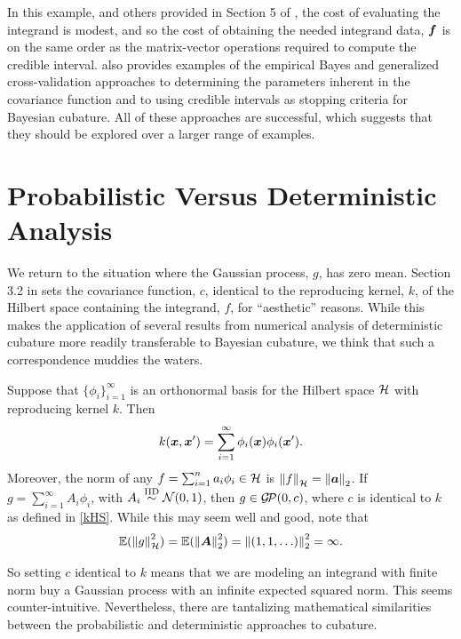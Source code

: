 \documentclass[sts]{imsart}
\numberwithin{equation}{section}
\theoremstyle{plain}
\newcommand{\calGP}{\cg\!\cp}
\newcommand{\BOGOS}{\citetalias{BriEtal18a}}%
\newcommand{\JH}{\citetalias{RatHic19a}}%
\begin{document}
In this example, and others provided in Section 5 of \JH{}, the cost of evaluating the integrand is modest, and so the cost of obtaining the needed integrand data, $\vf$ is on the same order as the matrix-vector operations required to compute the credible interval.  \JH{} also provides examples of the empirical Bayes and generalized cross-validation approaches to determining the parameters inherent in the covariance function and to using credible intervals as stopping criteria for Bayesian cubature.  All of these approaches are successful, which suggests that they should be explored over a larger range of examples.  

\section{Probabilistic Versus Deterministic Analysis} \label{sec:ProbDet}

We return to the situation where the Gaussian process, $g$, has zero mean.  Section 3.2 in \BOGOS{} sets the covariance function, $c$, identical to the reproducing kernel, $k$, of the Hilbert space containing the integrand, $f$, for ``aesthetic'' reasons.  While this makes the application of several results from numerical analysis of deterministic cubature more readily transferable to Bayesian cubature, we think that such a correspondence muddies the waters.  

Suppose that $\{\phi_i\}_{i=1}^\infty$ is an orthonormal basis for the Hilbert space $\ch$ with reproducing kernel $k$.  Then 
\begin{equation}
    \label{kHS}
    k(\vx,\vx') = \sum_{i=1}^\infty \phi_i(\vx) \phi_i(\vx').
\end{equation}
Moreover, the norm of any $f = \sum_{i=1}^n a_i \phi_i \in \ch$ is $\norm[\ch]{f} = \norm[2]{\va}$.  If $g = \sum_{i=1}^\infty A_i \phi_i$, with $A_i \IIDsim \cn(0,1)$, then $g \in \calGP(0,c)$, where $c$ is identical to $k$ as defined in \eqref{kHS}.  While this may seem well and good, note that 
\[
\Ex(\norm[\ch]{g}^2) = \Ex(\norm[2]{\vA}^2) = \norm[2]{(1,1, \ldots) }^2 = \infty.
\]

So setting $c$ identical to $k$ means that we are modeling an integrand with finite norm buy a Gaussian process with an infinite expected squared norm.
This seems counter-intuitive.  Nevertheless, there are tantalizing mathematical similarities between the probabilistic and deterministic approaches to cubature.
\end{document}
